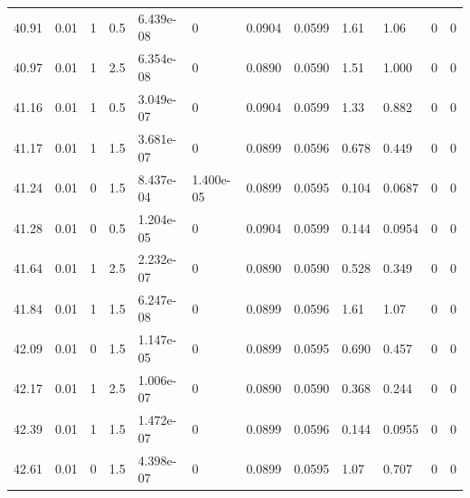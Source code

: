 \documentclass[preview]{standalone}
\begin{document}
{{{{{{{{\begin{tabular}{L{1.2cm}C{1.2cm} C{0.3cm}C{0.5cm} C{1.4cm}C{1.4cm} C{1.4cm}C{1.4cm} C{1.6cm}C{1.6cm} C{1.6cm}C{1.6cm}}
  40.91  &  0.01  & 1     & 0.5 &  6.439e-08  & 0  &  0.0904&   0.0599& 1.61 & 1.06   &  0 & 0  \\ 
  40.97  &  0.01  & 1     & 2.5 &  6.354e-08  & 0  &  0.0890&   0.0590& 1.51 & 1.000   &  0 & 0  \\ 
  41.16  &  0.01  & 1     & 0.5 &  3.049e-07  & 0  &  0.0904&   0.0599& 1.33 & 0.882   &  0 & 0  \\ 
  41.17  &  0.01  & 1     & 1.5 &  3.681e-07  & 0  &  0.0899&   0.0596& 0.678 & 0.449   &  0 & 0  \\ 
  41.24  &  0.01  & 0     & 1.5 &  8.437e-04  & 1.400e-05  &  0.0899&   0.0595& 0.104 & 0.0687   &  0 & 0  \\ 
  41.28  &  0.01  & 0     & 0.5 &  1.204e-05  & 0  &  0.0904&   0.0599& 0.144 & 0.0954   &  0 & 0  \\ 
  41.64  &  0.01  & 1     & 2.5 &  2.232e-07  & 0  &  0.0890&   0.0590& 0.528 & 0.349   &  0 & 0  \\ 
  41.84  &  0.01  & 1     & 1.5 &  6.247e-08  & 0  &  0.0899&   0.0596& 1.61 & 1.07   &  0 & 0  \\ 
  42.09  &  0.01  & 0     & 1.5 &  1.147e-05  & 0  &  0.0899&   0.0595& 0.690 & 0.457   &  0 & 0  \\ 
  42.17  &  0.01  & 1     & 2.5 &  1.006e-07  & 0  &  0.0890&   0.0590& 0.368 & 0.244   &  0 & 0  \\ 
  42.39  &  0.01  & 1     & 1.5 &  1.472e-07  & 0  &  0.0899&   0.0596& 0.144 & 0.0955   &  0 & 0  \\ 
  42.61  &  0.01  & 0     & 1.5 &  4.398e-07  & 0  &  0.0899&   0.0595& 1.07 & 0.707   &  0 & 0  \\ 
\hline 
\end{tabular} 

}}}}}}}}
\end{document}
